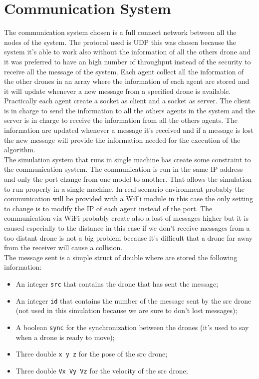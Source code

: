 \documentclass[11pt,twocolumn]{article}
\begin{document}
\section{Communication System}
The communication system chosen is a full connect network between all the nodes of the system. The protocol used is UDP this was chosen because the system it's able to work also without the information of all the others drone and it was preferred to have an high number of throughput instead of the security to receive all the message of the system. Each agent collect all the information of the other drones in an array where the information of each agent are stored and it will update whenever a new message from a specified drone is available. Practically each agent create a socket as client and a socket as server. The client is in charge to send the information to all the others agents in the system and the server is in charge to receive the information from all the others agents. The information are updated whenever a message it's received and if a message is lost the new message will provide the information needed for the execution of the algorithm. \\
The simulation system that runs in single machine has create some constraint to the communication system. The communication is run in the same IP address and only the port change from one model to another. That allows the simulation to run properly in a single machine. In real scenario environment probably the communication will be provided with a WiFi module in this case the only setting to change is to modify the IP of each agent instead of the port. The communication via WiFi probably create also a lost of messages higher but it is caused especially to the distance in this case if we don't receive messages from a too distant drone is not a big problem because it's difficult that a drone far away from the receiver will cause a collision.\\
The message sent is a simple struct of double where are stored the following information:
\begin{itemize}
\item An integer \verb|src| that contains the drone that has sent the message;
\item An integer \verb|id| that contains the number of the message sent by the src drone (not used in this simulation because we are sure to don't lost messages);
\item A boolean \verb|sync| for the synchronization between the drones (it's used to say when a drone is ready to move);
\item Three double \verb|x y z| for the pose of the src drone;
\item Three double \verb|Vx Vy Vz| for the velocity of the src drone;
\end{itemize}
\end{document}
